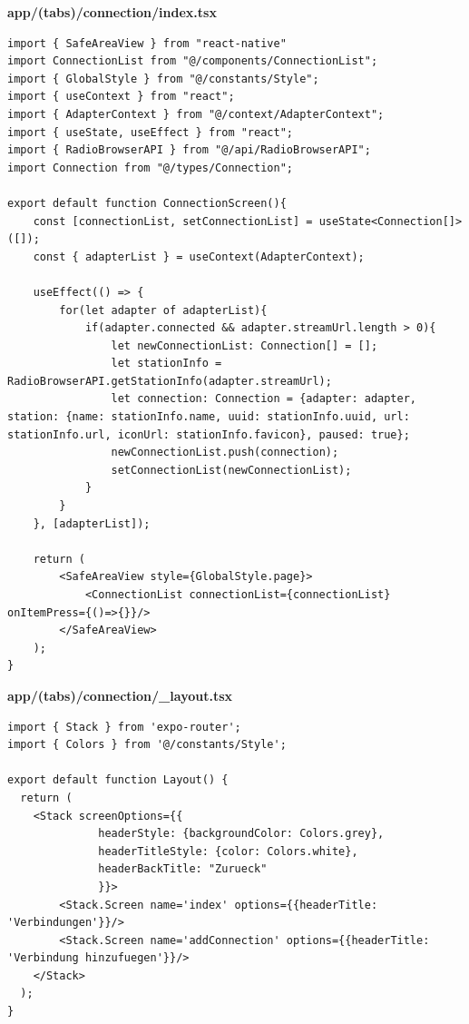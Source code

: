 \documentclass[11pt, twoside]{article}
\begin{document}
\textbf{app/(tabs)/connection/index.tsx}
\begin{lstlisting}
import { SafeAreaView } from "react-native"
import ConnectionList from "@/components/ConnectionList";
import { GlobalStyle } from "@/constants/Style";
import { useContext } from "react";
import { AdapterContext } from "@/context/AdapterContext";
import { useState, useEffect } from "react";
import { RadioBrowserAPI } from "@/api/RadioBrowserAPI";
import Connection from "@/types/Connection";

export default function ConnectionScreen(){
    const [connectionList, setConnectionList] = useState<Connection[]>([]);
    const { adapterList } = useContext(AdapterContext);

    useEffect(() => {
        for(let adapter of adapterList){
            if(adapter.connected && adapter.streamUrl.length > 0){
                let newConnectionList: Connection[] = [];
                let stationInfo = RadioBrowserAPI.getStationInfo(adapter.streamUrl);
                let connection: Connection = {adapter: adapter, station: {name: stationInfo.name, uuid: stationInfo.uuid, url: stationInfo.url, iconUrl: stationInfo.favicon}, paused: true};
                newConnectionList.push(connection);
                setConnectionList(newConnectionList);
            }
        }
    }, [adapterList]);

    return (
        <SafeAreaView style={GlobalStyle.page}>
            <ConnectionList connectionList={connectionList} onItemPress={()=>{}}/>
        </SafeAreaView>
    );
}
\end{lstlisting}

\textbf{app/(tabs)/connection/\_layout.tsx}
\begin{lstlisting}
import { Stack } from 'expo-router';
import { Colors } from '@/constants/Style';

export default function Layout() {
  return (
    <Stack screenOptions={{
              headerStyle: {backgroundColor: Colors.grey},
              headerTitleStyle: {color: Colors.white},
              headerBackTitle: "Zurueck"
              }}>
        <Stack.Screen name='index' options={{headerTitle: 'Verbindungen'}}/>
        <Stack.Screen name='addConnection' options={{headerTitle: 'Verbindung hinzufuegen'}}/>
    </Stack>
  );
}
\end{lstlisting}
\end{document}
